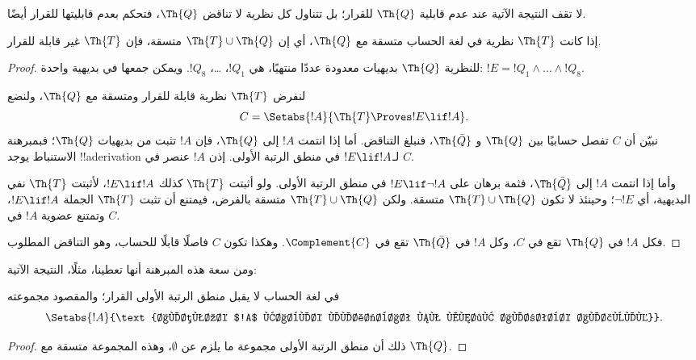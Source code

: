 \documentclass[../../../include/open-logic-section]{subfiles}
\begin{document}


لا تقف النتيجة الآتية عند عدم قابلية $\Th{Q}$ للقرار؛ بل تتناول
كل نظرية لا تناقض $\Th{Q}$، فتحكم بعدم قابليتها للقرار أيضًا.

\begin{thm}
إذا كانت $\Th{T}$ نظرية في لغة الحساب متسقة مع $\Th{Q}$، أي إن
$\Th{T}\cup\Th{Q}$ متسقة، فإن $\Th{T}$ غير قابلة للقرار.
\end{thm}

\begin{proof}
للنظرية $\Th{Q}$ بديهيات معدودة عددًا منتهيًا، هي $!Q_1$، \dots،
$!Q_8$. ويمكن جمعها في بديهية واحدة:
$!E=!Q_1\land\dots\land !Q_8$.

لنفرض $\Th{T}$ نظرية قابلة للقرار ومتسقة مع $\Th{Q}$، ولنضع
\[
C=\Setabs{!A}{\Th{T}\Proves !E\lif !A}.
\]
نبيّن أن $C$ تفصل حسابيًا بين $\Th{Q}$ و
$\Th{\bar Q}$، فنبلغ التناقض. أما إذا انتمت $!A$ إلى $\Th{Q}$،
فإن $!A$ تثبت من بديهيات $\Th{Q}$؛ فبمبرهنة الاستنباط يوجد
!!a{derivation} لـ$!E\lif !A$ في منطق الرتبة الأولى.
إذن $!A$ عنصر في $C$.

وأما إذا انتمت $!A$ إلى $\Th{\bar Q}$، فثمة برهان على
$!E\lif\lnot !A$ في منطق الرتبة الأولى. ولو أثبتت $\Th{T}$
كذلك $!E\lif !A$، لأثبتت $\Th{T}$ نفي البديهية، أي $\lnot !E$؛
وحينئذ لا تكون $\Th{T}\cup\Th{Q}$ متسقة. ولكن
$\Th{T}\cup\Th{Q}$ متسقة بالفرض، فيمتنع أن تثبت $\Th{T}$
الجملة $!E\lif !A$، وتمتنع عضوية $!A$ في $C$.

فكل $!A$ في $\Th{Q}$ تقع في $C$،
وكل $!A$ في $\Th{\bar Q}$ تقع في $\Complement{C}$.
وهكذا تكون $C$ فاصلًا قابلًا للحساب، وهو التناقض المطلوب.
\end{proof}

ومن سعة هذه المبرهنة أنها تعطينا، مثلًا، النتيجة الآتية:

\begin{cor}
  في لغة الحساب لا يقبل منطق الرتبة الأولى القرار؛ والمقصود مجموعته
  \[
    \Setabs{!A}{\text{الصيغة $!A$ قابلة للإثبات في منطق الرتبة الأولى}}.
  \]
\end{cor}

\begin{proof}
ذلك أن منطق الرتبة الأولى مجموعة ما يلزم عن $\emptyset$،
وهذه المجموعة متسقة مع $\Th{Q}$.
\end{proof}
\end{document}
